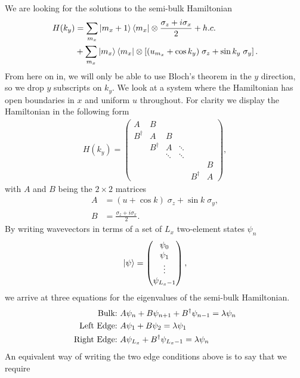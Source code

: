 We are looking for the solutions to the semi-bulk Hamiltonian
\begin{align}
    H(k_y) &= \sum_{m_x} \ket{m_x+1}\bra{m_x} \otimes \frac{\sigma_z + i\sigma_x}{2} + h.c.\nonumber \\
    &+ \sum_{m_x} \ket{m_x}\bra{m_x} \otimes \left [ (u_{m_x} + \cos k_y) \; \sigma_z + \sin k_y \; \sigma_y  \right ].
\end{align}
From here on in, we will only be able to use Bloch's theorem in the $y$ direction, so we drop $y$ subscripts on $k_y$. We look at a system where the Hamiltonian has open boundaries in $x$ and uniform $u$ throughout. For clarity we display the Hamiltonian in the following form
\begin{align}
    H(k_y) = \begin{pmatrix}
 A& B &  &  & &\\ 
 B^\dag& A &B  &  & &\\ 
 &  B^\dag& A &  \ddots& &\\ 
 &  &  \ddots& \ddots & &\\ 
 &  &  & & &B\\
 &  & & & B^\dag & A
\end{pmatrix},
\end{align}
with $A$ and $B$ being the $2\times2$ matrices
\begin{align}
    A &= (u + \cos k) \; \sigma_z + \sin k \; \sigma_y,  \\ 
    B &= \frac{\sigma_z + i\sigma_x}{2}.
\end{align}
By writing wavevectors in terms of a set of $L_x$ two-element states $\psi_n$
\begin{align}
    \ket{\psi} = \begin{pmatrix}
    \psi_0 \\
    \psi_1 \\
    \vdots \\
    \psi_{L_x -1}
     \end{pmatrix},
\end{align}
we arrive at three equations for the eigenvalues of the semi-bulk Hamiltonian.
\begin{align}
    \textup{Bulk:} &\ A\psi_n + B\psi_{n+1} + B^\dag \psi_{n-1} = \lambda \psi_n \\
    \textup{Left Edge:} &\ A\psi_1 + B\psi_{2} = \lambda \psi_1\\
    \textup{Right Edge:} &\ A\psi_{L_x} + B^\dag \psi_{L_x-1}  = \lambda \psi_n
\end{align}
An equivalent way of writing the two edge conditions above is to say that we require
